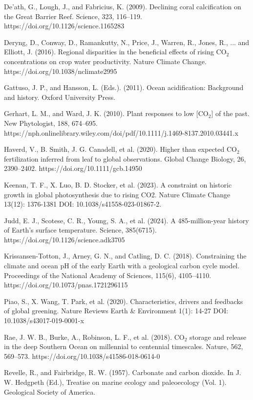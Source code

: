 \documentclass[12pt,paper=a4,DIV=12,parskip=never,chapterprefix=false,headings=standardclasses]{scrreprt}
\begin{document}
De'ath, G., Lough, J., and Fabricius, K. (2009). Declining coral calcification on the Great Barrier Reef. Science, 323, 116–119. https://doi.org/10.1126/science.1165283

Deryng, D., Conway, D., Ramankutty, N., Price, J., Warren, R., Jones, R., ... and Elliott, J. (2016). Regional disparities in the beneficial effects of rising CO$_2$ concentrations on crop water productivity. Nature Climate Change. https://doi.org/10.1038/nclimate2995

Gattuso, J. P., and Hansson, L. (Eds.). (2011). Ocean acidification: Background and history. Oxford University Press.

Gerhart, L. M., and Ward, J. K. (2010). Plant responses to low [CO$_2$] of the past. New Phytologist, 188, 674–695. https://nph.onlinelibrary.wiley.com/doi/pdf/10.1111/j.1469-8137.2010.03441.x

Haverd, V., B. Smith, J. G. Canadell, et al. (2020). Higher than expected CO$_2$ fertilization inferred from leaf to global observations. Global Change Biology, 26, 2390–2402. https://doi.org/10.1111/gcb.14950

Keenan, T. F., X. Luo, B. D. Stocker, et al. (2023). A constraint on historic growth in global photosynthesis due to rising CO2. Nature Climate Change 13(12): 1376-1381 DOI: 10.1038/s41558-023-01867-2.

Judd, E. J., Scotese, C. R., Young, S. A., et al. (2024). A 485-million-year history of Earth's surface temperature. Science, 385(6715). https://doi.org/10.1126/science.adk3705

Krissansen-Totton, J., Arney, G. N., and Catling, D. C. (2018). Constraining the climate and ocean pH of the early Earth with a geological carbon cycle model. Proceedings of the National Academy of Sciences, 115(6), 4105–4110. https://doi.org/10.1073/pnas.1721296115

Piao, S., X. Wang, T. Park, et al. (2020). Characteristics, drivers and feedbacks of global greening. Nature Reviews Earth \& Environment 1(1): 14-27 DOI: 10.1038/s43017-019-0001-x

Rae, J. W. B., Burke, A., Robinson, L. F., et al. (2018). CO$_2$ storage and release in the deep Southern Ocean on millennial to centennial timescales. Nature, 562, 569–573. https://doi.org/10.1038/s41586-018-0614-0

Revelle, R., and Fairbridge, R. W. (1957). Carbonate and carbon dioxide. In J. W. Hedgpeth (Ed.), Treatise on marine ecology and paleoecology (Vol. 1). Geological Society of America.
\end{document}
